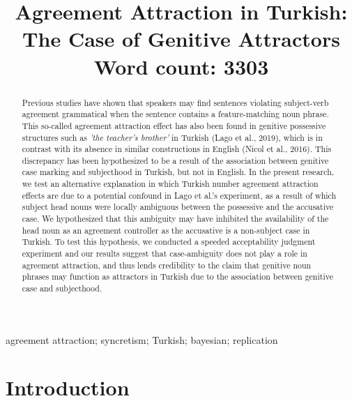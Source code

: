 \documentclass[apacite,linguex]{glossa}\usepackage[]{graphicx}\usepackage[]{color}
\title[Agreement Attraction in Turkish]{Agreement Attraction in Turkish: The Case of Genitive Attractors\\ \bigskip \large Word count: 3303}
\author[\firstauthorshort \& \secondauthorshort]%
{%
  \spauthor{\firstauthor\\ 
  \institute{Bo\u{g}azi\c{c}i University}\\
  \small{
    \texttt{utku.turk@boun.edu.tr}}
  }
  \AND
  \spauthor{\secondauthor\\ 
  \institute{Bo\u{g}azi\c{c}i University}\\
  \small{
    \texttt{pavel.logacev@boun.edu.tr}}
  }%
}
\begin{document}
\sffamily
\maketitle


\begin{abstract}

Previous studies have shown that speakers may find sentences violating subject-verb agreement grammatical when the sentence contains a feature-matching noun phrase. This so-called agreement attraction effect has also been found in genitive possessive structures such as \textit{'the teacher's brother'} in Turkish (Lago et al., 2019), which is in contrast with its absence in similar constructions in English (Nicol et al., 2016). This discrepancy has been hypothesized to be a result of the association between genitive case marking and subjecthood in Turkish, but not in English. In the present research, we test an alternative explanation in which Turkish number agreement attraction effects are due to a potential confound in Lago et al.'s experiment, as a result of which subject head nouns were locally ambiguous between the possessive and the accusative case. We hypothesized that this ambiguity may have inhibited the availability of the head noun as an agreement controller as the accusative is a non-subject case in Turkish. To test this hypothesis, we conducted a speeded acceptability judgment experiment and our results suggest that case-ambiguity does not play a role in agreement attraction, and thus lends credibility to the claim that genitive noun phrases may function as attractors in Turkish due to the association between genitive case and subjecthood. %


\end{abstract}

\begin{keywords}
agreement attraction; syncretism; Turkish; bayesian; replication
\end{keywords}

\rmfamily




\section{Introduction}
\end{document}
